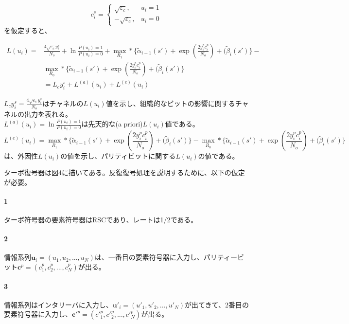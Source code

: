 \documentclass[20 pts]{article}
\begin{document}
\[
    c_i^s= 
\begin{cases}
   \sqrt{\varepsilon_c},& u_i= 1\\        -\sqrt{\varepsilon_c},              & u_i= 0
\end{cases}
\]
を仮定すると、

\begin{equation}
\begin{split}
L(u_i)=&\frac{4\sqrt{\varepsilon_c}y_i^s}{N_o}+\ln\frac{P(u_i)=1}{P(u_i)=0}+\max_{R_1}*\Big\{\widetilde{\alpha}_{i-1}(s')+\exp(\frac{2y_i^pc_i^p}{N_o})+(\widetilde{\beta}_{i}(s')\Big\}-\\&\max_{R_0}*\Big\{\widetilde{\alpha}_{i-1}(s')+\exp(\frac{2y_i^pc_i^p}{N_o})+(\widetilde{\beta}_{i}(s')\Big\}\\
&=L_cy_i^s+L^{(a)}(u_i)+L^{(e)}(u_i)
\end{split}
\end{equation}


$L_cy_i^s=\frac{4\sqrt{\varepsilon_c}y_i^s}{N_o}$はチャネルの$L(u_i)$値を示し、組織的なビットの影響に関するチャネルの出力を表れる。\\
$L^{(a)}(u_i)=\ln\frac{P(u_i)=1}{P(u_i)=0}$は先天的な(a priori)$ L(u_i)$値である。\\
$$L^{(e)}(u_i)=\max_{R_1}*\Big\{\widetilde{\alpha}_{i-1}(s')+\exp(\frac{2y_i^pc_i^p}{N_o})+(\widetilde{\beta}_{i}(s')\Big\}-\max_{R_0}*\Big\{\widetilde{\alpha}_{i-1}(s')+\exp(\frac{2y_i^pc_i^p}{N_o})+(\widetilde{\beta}_{i}(s')\Big\}$$は、外因性$L(u_i)$の値を示し、パリティビットに関する$L(u_i)$の値である。

ターボ復号器は図4に描いてある。反復復号処理を説明するために、以下の仮定が必要。\paragraph{1}
 ターボ符号器の要素符号器はRSCであり、レートは1/2である。\paragraph{2}

 情報系列$\boldsymbol{u}_i=(u_1,u_2,...,u_N)$は、一番目の要素符号器に入力し、パリティービット$\boldsymbol{c}^p=(c_1^p,c_2^p,...,c_N^p)$が出る。\paragraph{3}

 情報系列はインタリーバに入力し、${\boldsymbol{u}'}_i=({u'}_1,{u'}_2,...,{u'}_N)$が出てきて、2番目の要素符号器に入力し、${\boldsymbol{c}'}^p=({c'}_1^p,{c'}_2^p,...,{c'}_N^p)$が出る。
\end{document}
